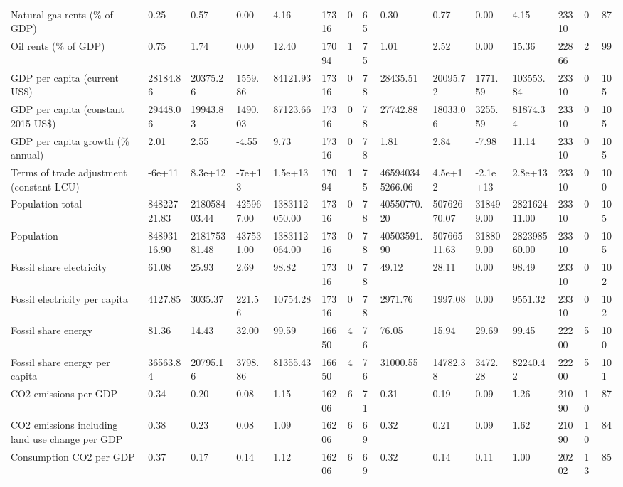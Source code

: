 \begin{longtable}{lllllllllllllll}
\addlinespace
Natural gas rents (\% of GDP) & 0.25 & 0.57 & 0.00 & 4.16 & 17316 & 0 & 65 & 0.30 & 0.77 & 0.00 & 4.15 & 23310 & 0 & 87\\
Oil rents (\% of GDP) & 0.75 & 1.74 & 0.00 & 12.40 & 17094 & 1 & 75 & 1.01 & 2.52 & 0.00 & 15.36 & 22866 & 2 & 99\\
GDP per capita (current US\$) & 28184.86 & 20375.26 & 1559.86 & 84121.93 & 17316 & 0 & 78 & 28435.51 & 20095.72 & 1771.59 & 103553.84 & 23310 & 0 & 105\\
GDP per capita (constant 2015 US\$) & 29448.06 & 19943.83 & 1490.03 & 87123.66 & 17316 & 0 & 78 & 27742.88 & 18033.06 & 3255.59 & 81874.34 & 23310 & 0 & 105\\
GDP per capita growth (\% annual) & 2.01 & 2.55 & -4.55 & 9.73 & 17316 & 0 & 78 & 1.81 & 2.84 & -7.98 & 11.14 & 23310 & 0 & 105\\
\addlinespace
Terms of trade adjustment (constant LCU) & -6e+11 & 8.3e+12 & -7e+13 & 1.5e+13 & 17094 & 1 & 75 & 465940345266.06 & 4.5e+12 & -2.1e+13 & 2.8e+13 & 23310 & 0 & 100\\
Population total & 84822721.83 & 218058403.44 & 425967.00 & 1383112050.00 & 17316 & 0 & 78 & 40550770.20 & 50762670.07 & 318499.00 & 282162411.00 & 23310 & 0 & 105\\
Population & 84893116.90 & 218175381.48 & 437531.00 & 1383112064.00 & 17316 & 0 & 78 & 40503591.90 & 50766511.63 & 318809.00 & 282398560.00 & 23310 & 0 & 105\\
Fossil share electricity & 61.08 & 25.93 & 2.69 & 98.82 & 17316 & 0 & 78 & 49.12 & 28.11 & 0.00 & 98.49 & 23310 & 0 & 102\\
Fossil electricity per capita & 4127.85 & 3035.37 & 221.56 & 10754.28 & 17316 & 0 & 78 & 2971.76 & 1997.08 & 0.00 & 9551.32 & 23310 & 0 & 102\\
\addlinespace
Fossil share energy & 81.36 & 14.43 & 32.00 & 99.59 & 16650 & 4 & 76 & 76.05 & 15.94 & 29.69 & 99.45 & 22200 & 5 & 100\\
Fossil share energy per capita & 36563.84 & 20795.16 & 3798.86 & 81355.43 & 16650 & 4 & 76 & 31000.55 & 14782.38 & 3472.28 & 82240.42 & 22200 & 5 & 101\\
CO2 emissions per GDP & 0.34 & 0.20 & 0.08 & 1.15 & 16206 & 6 & 71 & 0.31 & 0.19 & 0.09 & 1.26 & 21090 & 10 & 87\\
CO2 emissions including land use change per GDP & 0.38 & 0.23 & 0.08 & 1.09 & 16206 & 6 & 69 & 0.32 & 0.21 & 0.09 & 1.62 & 21090 & 10 & 84\\
Consumption CO2 per GDP & 0.37 & 0.17 & 0.14 & 1.12 & 16206 & 6 & 69 & 0.32 & 0.14 & 0.11 & 1.00 & 20202 & 13 & 85\\

\end{longtable}
